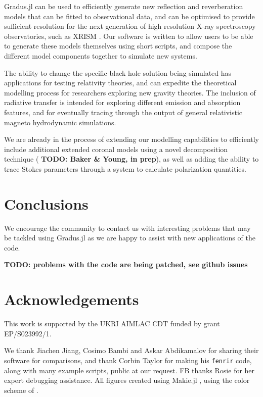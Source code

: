 \documentclass[fleqn,usenatbib]{mnras}
\newcommand{\todo}[1]{{\noindent \bf \color{red} TODO: #1}}
\newcommand{\Gradus}{Gradus.jl\xspace}
\begin{document}
\Gradus can be used to efficiently generate new reflection and reverberation
models that can be fitted to observational data, and can be optimised to provide
sufficient resolution for the next generation of high resolution X-ray
spectroscopy observatories, such as XRISM \citep{tashiro_xrism_2020}. Our software is written to
allow users to be able to generate these models themselves using short scripts,
and compose the different model components together to simulate new systems.

The ability to change the specific black hole solution being simulated has
applications for testing relativity theories, and can expedite the theoretical
modelling process for researchers exploring new gravity theories. The inclusion
of radiative transfer is intended for exploring different emission and
absorption features, and for eventually tracing through the output of general
relativistic magneto hydrodynamic simulations.

We are already in the process of extending our modelling capabilities to
efficiently include additional extended coronal models using a novel
decomposition technique (\todo{Baker \& Young, in prep}), as well as adding
the ability to trace Stokes parameters through a system to calculate
polarization quantities.

\section{Conclusions}
\label{sec:conclusion}

We encourage the community to contact us with interesting problems that may be tackled using \Gradus as we are happy to assist with new applications of the code.

\todo{problems with the code are being patched, see github issues}

\section*{Acknowledgements}
This work is supported by the UKRI AIMLAC CDT funded by grant EP/S023992/1.

We thank Jiachen Jiang, Cosimo Bambi and Askar Abdikamalov for sharing their
software for comparisons, and thank Corbin Taylor for making his
\texttt{fenrir} code, along with many example scripts, public at our request. FB thanks Rosie for her expert debugging assistance. All figures created using Makie.jl \citep{DanischKrumbiegel2021}, using the color scheme of \cite{wong_points_2011}.
\end{document}
